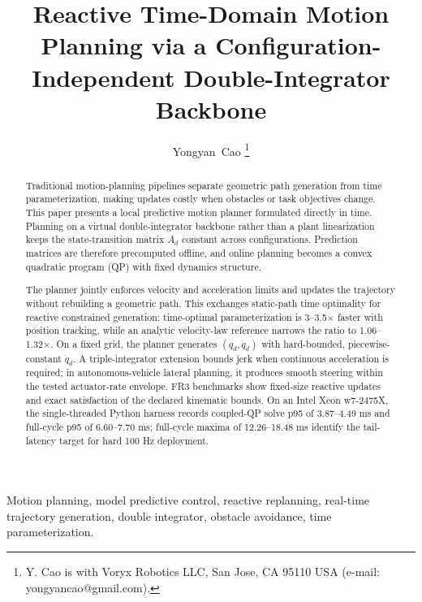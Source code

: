 \documentclass[journal]{IEEEtran}
\begin{document}
\title{Reactive Time-Domain Motion Planning via a Configuration-Independent Double-Integrator Backbone}

\author{Yongyan~Cao%
\thanks{Y. Cao is with Voryx Robotics LLC, San Jose, CA 95110 USA
(e-mail: yongyancao@gmail.com).}}

\maketitle

\begin{abstract}
Traditional motion-planning pipelines separate geometric path generation
from time parameterization, making updates costly when obstacles or task
objectives change. This paper presents a local predictive motion planner
formulated directly in time. Planning on a virtual double-integrator
backbone rather than a plant linearization keeps the state-transition matrix
$A_d$ constant across configurations. Prediction matrices are therefore
precomputed offline, and online planning becomes a convex quadratic program
(QP) with fixed dynamics structure.

The planner jointly enforces velocity and acceleration limits and updates the
trajectory without rebuilding a geometric path. This exchanges static-path
time optimality for reactive constrained generation: time-optimal
parameterization is 3--3.5$\times$ faster with position tracking, while an
analytic velocity-law reference narrows the ratio to 1.06--1.32$\times$.
On a fixed grid, the planner generates $(q_d,\dot q_d)$ with hard-bounded,
piecewise-constant $\ddot q_d$. A triple-integrator extension bounds jerk when
continuous acceleration is required; in autonomous-vehicle lateral planning,
it produces smooth steering within the tested actuator-rate envelope. FR3
benchmarks show fixed-size reactive updates and exact satisfaction of the
declared kinematic bounds. On an Intel Xeon w7-2475X, the single-threaded
Python harness records coupled-QP solve p95 of 3.87--4.49 ms and full-cycle p95
of 6.60--7.70 ms; full-cycle maxima of 12.26--18.48 ms identify the
tail-latency target for hard 100 Hz deployment.
\end{abstract}

\begin{IEEEkeywords}
Motion planning, model predictive control, reactive replanning, real-time trajectory generation, double integrator, 
obstacle avoidance, time parameterization.
\end{IEEEkeywords}



\end{document}

